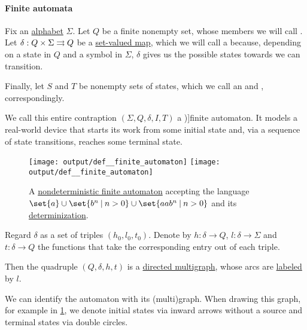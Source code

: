 \paragraph{Finite automata}

\begin{definition}\label{def:finite_automaton}
  Fix an \hyperref[def:formal_language]{alphabet} \( \Sigma \). Let \( Q \) be a finite nonempty set, whose members we will call . Let \( \delta: Q \times \Sigma \rightrightarrows Q \) be a \hyperref[def:set_valued_map]{set-valued map}, which we will call a  because, depending on a state in \( Q \) and a symbol in \( \Sigma \), \( \delta \) gives us the possible states towards we can transition.

  Finally, let \( S \) and \( T \) be nonempty sets of states, which we call an  and , correspondingly.

  We call this entire contraption \( (\Sigma, Q, \delta, I, T) \) a \term[ru=конечный автомат (\cite[159]{Гладкий1973})]{finite automaton}. It models a real-world device that starts its work from some initial state and, via a sequence of state transitions, reaches some terminal state.

  \begin{figure}[!ht]
    \hfill
    \texttt{[image: output/def\_\_finite\_automaton]}
    \hfill
    \texttt{[image: output/def\_\_finite\_automaton]}
    \hfill\hfill
    \caption{A \hyperref[def:finite_automaton/determinism]{nondeterministic finite automaton} accepting the language \( \set{ a } \cup \set{ b^n \given n > 0 } \cup \set{ aa b^n \given n > 0 } \) and its \hyperref[alg:determinization_of_finite_automata]{determinization}.}
    \label{fig:def:finite_automaton}
  \end{figure}

  \begin{thmenum}
    \mimprovised Regard \( \delta \) as a set of triples \( (h_0, l_0, t_0) \). Denote by \( h: \delta \to Q \), \( l: \delta \to \Sigma \) and \( t: \delta \to Q \) the functions that take the corresponding entry out of each triple.

    Then the quadruple \( (Q, \delta, h, t) \) is a \hyperref[def:directed_multigraph]{directed multigraph}, whose arcs are \hyperref[def:labeled_set]{labeled} by \( l \).

    We can identify the automaton with its (multi)graph. When drawing this graph, for example in \cref{fig:def:finite_automaton}, we denote initial states via inward arrows without a source and terminal states via double circles.


\end{thmenum}
\end{definition}
